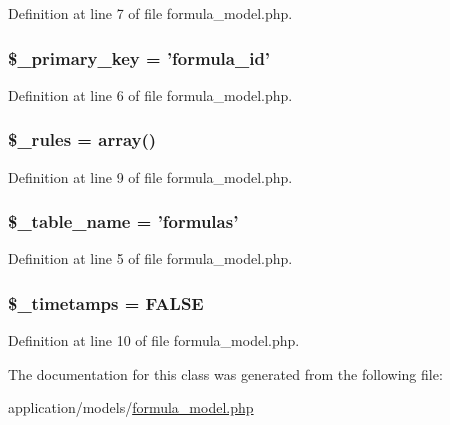 Definition at line 7 of file formula\-\_\-model.\-php.

\hypertarget{classformula__model_a1befeb0c72587cd2574cd7d1818d66b8}{
\subsubsection[{\$\-\_\-primary\-\_\-key}]{\setlength{\rightskip}{0pt plus 5cm}\$\-\_\-primary\-\_\-key = 'formula\-\_\-id'\hspace{0.3cm}{\ttfamily [protected]}}}\label{classformula__model_a1befeb0c72587cd2574cd7d1818d66b8}


Definition at line 6 of file formula\-\_\-model.\-php.

\hypertarget{classformula__model_a2432b65e7e8b8a8328a1c47ab6ca0409}{
\subsubsection[{\$\-\_\-rules}]{\setlength{\rightskip}{0pt plus 5cm}\$\-\_\-rules = array()\hspace{0.3cm}{\ttfamily [protected]}}}\label{classformula__model_a2432b65e7e8b8a8328a1c47ab6ca0409}


Definition at line 9 of file formula\-\_\-model.\-php.

\hypertarget{classformula__model_a90ebc25e748e2696e00b5c5cf3255ee4}{
\subsubsection[{\$\-\_\-table\-\_\-name}]{\setlength{\rightskip}{0pt plus 5cm}\$\-\_\-table\-\_\-name = 'formulas'\hspace{0.3cm}{\ttfamily [protected]}}}\label{classformula__model_a90ebc25e748e2696e00b5c5cf3255ee4}


Definition at line 5 of file formula\-\_\-model.\-php.

\hypertarget{classformula__model_a0af45edfd9d801cbc582a244700cd824}{
\subsubsection[{\$\-\_\-timetamps}]{\setlength{\rightskip}{0pt plus 5cm}\$\-\_\-timetamps = F\-A\-L\-S\-E\hspace{0.3cm}{\ttfamily [protected]}}}\label{classformula__model_a0af45edfd9d801cbc582a244700cd824}


Definition at line 10 of file formula\-\_\-model.\-php.



The documentation for this class was generated from the following file\-:\begin{DoxyCompactItemize}
\item 
application/models/\hyperlink{formula__model_8php}{formula\-\_\-model.\-php}\end{DoxyCompactItemize}
